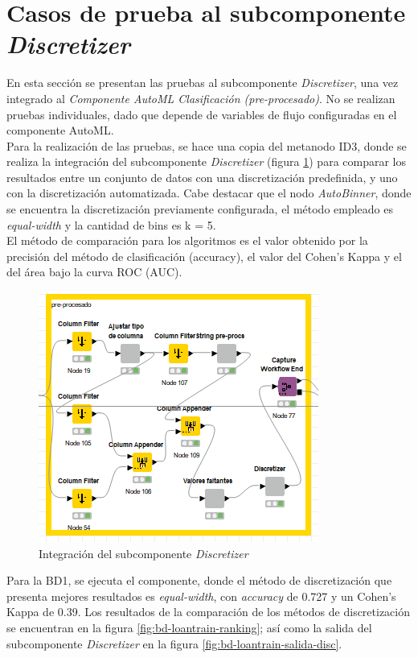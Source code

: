 \section{Casos de prueba al subcomponente \textit{Discretizer}}
En esta sección se presentan las pruebas al subcomponente \textit{Discretizer}, una vez integrado al \textit{Componente AutoML Clasificación (pre-procesado)}. No se realizan pruebas individuales, dado que depende de variables de flujo configuradas en el componente AutoML. \\
Para la realización de las pruebas, se hace una copia del metanodo ID3, donde se realiza la integración del subcomponente \textit{Discretizer} (figura \ref{fig:integracion-comp-discretizer}) para comparar los resultados entre un conjunto de datos con una discretización predefinida, y uno con la discretización automatizada. Cabe destacar que el nodo \textit{AutoBinner}, donde se encuentra la discretización previamente configurada, el método empleado es \textit{equal-width} y la cantidad de bins es k = 5. \\
El método de comparación para los algoritmos es el valor obtenido por la precisión del método de clasificación (accuracy), el valor del Cohen's Kappa y el del área bajo la curva ROC (AUC).
\begin{figure}[H]
	\centering
	\includegraphics[width=0.6\linewidth]{"figuras/capi 3/integracion-comp-discretizer"}
	\caption{Integración del subcomponente \textit{Discretizer}}
	\label{fig:integracion-comp-discretizer}
\end{figure}

Para la BD1, se ejecuta el componente, donde el método de discretización que presenta mejores resultados es \textit{equal-width}, con \textit{accuracy} de 0.727 y un Cohen's Kappa de 0.39. Los resultados de la comparación de los métodos de discretización se encuentran en la figura \ref{fig:bd-loantrain-ranking}; así como la salida del subcomponente \textit{Discretizer} en la figura \ref{fig:bd-loantrain-salida-disc}. 

